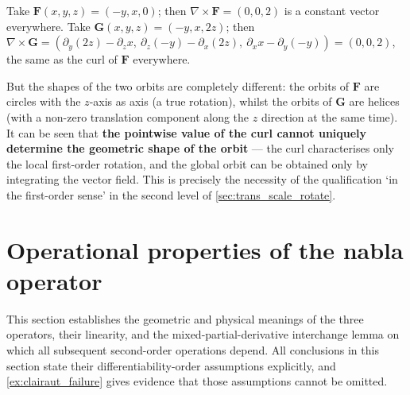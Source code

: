\begin{example}\label{ex:constant_curl_nonrotation}
Take $\mathbf F(x,y,z) = (-y, x, 0)$; then $\nabla\times\mathbf F = (0,0,2)$ is a constant vector everywhere. Take $\mathbf G(x,y,z) = (-y, x, 2z)$; then $\nabla\times\mathbf G = (\partial_y(2z)-\partial_z x,\ \partial_z(-y)-\partial_x(2z),\ \partial_x x-\partial_y(-y)) = (0,0,2)$, the same as the curl of $\mathbf F$ everywhere.

But the shapes of the two orbits are completely different: the orbits of $\mathbf F$ are circles with the $z$-axis as axis (a true rotation), whilst the orbits of $\mathbf G$ are helices (with a non-zero translation component along the $z$ direction at the same time). It can be seen that \textbf{the pointwise value of the curl cannot uniquely determine the geometric shape of the orbit} --- the curl characterises only the local first-order rotation, and the global orbit can be obtained only by integrating the vector field. This is precisely the necessity of the qualification `in the first-order sense' in the second level of \cref{sec:trans_scale_rotate}.
\end{example}

\section{Operational properties of the nabla operator}\label{sec:nabla_properties}

This section establishes the geometric and physical meanings of the three operators, their linearity, and the mixed-partial-derivative interchange lemma on which all subsequent second-order operations depend. All conclusions in this section state their differentiability-order assumptions explicitly, and \cref{ex:clairaut_failure} gives evidence that those assumptions cannot be omitted.

